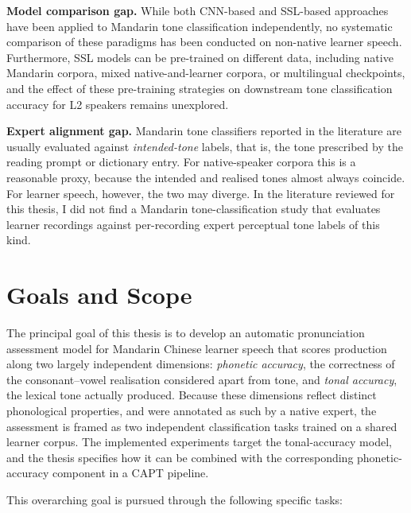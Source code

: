 \textbf{Model comparison gap.} While both CNN-based and SSL-based approaches have been applied to Mandarin tone classification independently, no systematic comparison of these paradigms has been conducted on non-native learner speech. Furthermore, SSL models can be pre-trained on different data, including native Mandarin corpora, mixed native-and-learner corpora, or multilingual checkpoints, and the effect of these pre-training strategies on downstream tone classification accuracy for L2 speakers remains unexplored.

\textbf{Expert alignment gap.} Mandarin tone classifiers reported in the literature are usually evaluated against \emph{intended-tone} labels, that is, the tone prescribed by the reading prompt or dictionary entry. For native-speaker corpora this is a reasonable proxy, because the intended and realised tones almost always coincide. For learner speech, however, the two may diverge. In the literature reviewed for this thesis, I did not find a Mandarin tone-classification study that evaluates learner recordings against per-recording expert perceptual tone labels of this kind.

\section{Goals and Scope}
\label{sec:intro:goals}

The principal goal of this thesis is to develop an automatic pronunciation assessment model for Mandarin Chinese learner speech that scores production along two largely independent dimensions: \emph{phonetic accuracy}, the correctness of the consonant--vowel realisation considered apart from tone, and \emph{tonal accuracy}, the lexical tone actually produced. Because these dimensions reflect distinct phonological properties, and were annotated as such by a native expert, the assessment is framed as two independent classification tasks trained on a shared learner corpus. The implemented experiments target the tonal-accuracy model, and the thesis specifies how it can be combined with the corresponding phonetic-accuracy component in a CAPT pipeline.

This overarching goal is pursued through the following specific tasks:

